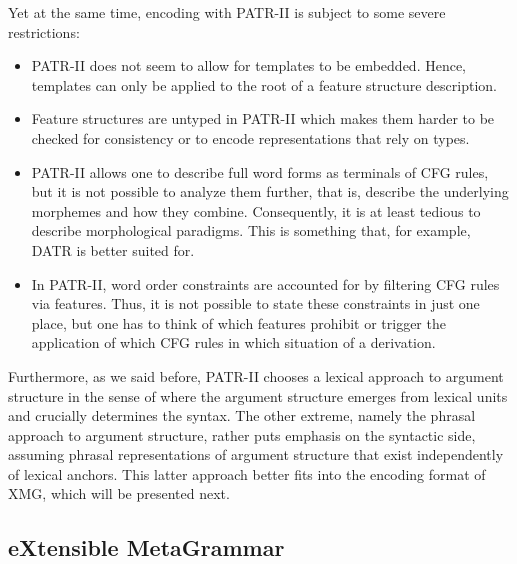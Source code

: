 \documentclass[output=paper
,modfonts
,nonflat
,biblatexbackend=biber
]{langsci/langscibook}
\begin{document}
Yet at the same time, encoding with PATR-II is subject to some severe restrictions:
\begin{itemize}
\item PATR-II does not seem to allow for templates to be embedded. Hence, templates can only be applied to the root of a feature structure description. 
\item Feature structures are untyped in PATR-II which makes them harder to be checked for consistency or to encode representations that rely on types. 
\item PATR-II allows one to describe full word forms as terminals of CFG rules, but it is not possible to analyze them further, that is, describe the underlying morphemes and how they combine. Consequently, it is at least tedious to describe morphological paradigms. This is something that, for example, DATR \citep{evans:gazdar:96} is better suited for.
\item In PATR-II, word order constraints are accounted for by filtering CFG rules via features. Thus, it is not possible to state these constraints in just one place, but one has to think of which features prohibit or trigger the application of which CFG rules in which situation of a derivation.
\end{itemize}
Furthermore, as we said before, PATR-II chooses a lexical approach to argument structure in the sense of \cite{mueller:wechsler:14} where the argument structure emerges from lexical units and crucially determines the syntax. The other extreme, namely the phrasal approach to argument structure, rather puts emphasis on the syntactic side, assuming phrasal representations of argument structure that exist independently of lexical anchors. This latter approach better fits into the encoding format of XMG, which will be presented next. 


%
\subsection{eXtensible MetaGrammar}
\label{lic:sec:xmg}
\end{document}
